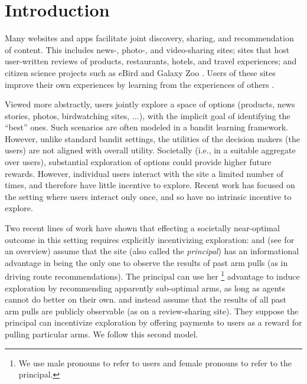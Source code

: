 \section{Introduction} \label{sec:introduction}

Many websites and apps facilitate joint discovery,
sharing, and recommendation of content.
This includes news-, photo-, and video-sharing sites;
sites that host user-written reviews of products, restaurants, hotels, and travel experiences;
and citizen science projects
such as eBird \citep{sullivan2009ebird,xue-ebird} and Galaxy Zoo \citep{lintott-galaxy-zoo}.
Users of these sites improve their own experiences 
by learning from the experiences of others 
\citep{schmit2017human}.

Viewed more abstractly, users jointly explore a space of
options (products, news stories, photos, birdwatching sites,
$\ldots$),
with the implicit goal of identifying the ``best'' ones.
Such scenarios are often modeled in a bandit
learning framework.
However, unlike standard bandit settings, the utilities of the
decision makers (the users) are not aligned with overall utility.
Societally (i.e., in a suitable aggregate over users),
substantial exploration of options could provide higher future rewards.
However, individual users interact with the site a limited number
of times, and therefore have little incentive to explore.
Recent work has focused on the setting where users interact only once, 
and so have no intrinsic incentive to explore.  

Two recent lines of work have shown that
effecting a societally near-optimal outcome in this setting requires
explicitly incentivizing exploration:
\citet{kremer2014implementing}
and
\citet{mansour2015bayesian,mansour2016bayesian,mansour2018competition}
(see \cite{slivkins:asymmetry} for an overview)
assume that the site (also called the \emph{principal}) has an
informational advantage in being the only one to observe the results
of past arm pulls
(as in driving route recommendations).
The principal can use her%
\footnote{We use male pronouns to refer to users and female pronouns
  to refer to the principal.}
advantage to induce exploration by recommending apparently sub-optimal arms,
as long as agents cannot do better on their own.
\citet{frazier2014incentivizing} and 
\citet{han2015incentivizing} instead assume that the results of all
past arm pulls are publicly observable
(as on a review-sharing site).
They suppose the principal can incentivize exploration by offering payments to users as
a reward for pulling particular arms.
We follow this second model.

